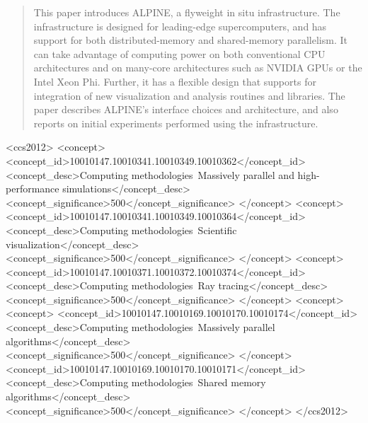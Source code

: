 \documentclass[sigconf]{acmart}
\begin{document}
\begin{abstract}
This paper introduces ALPINE, a flyweight in situ infrastructure.
%
The infrastructure is designed for leading-edge supercomputers, and
has support for both distributed-memory and shared-memory parallelism.
%
It can take advantage of computing power on both conventional CPU architectures
and on many-core architectures such as NVIDIA GPUs or the Intel Xeon Phi.
%
Further, it has a flexible design that supports for integration of new
visualization and analysis routines and libraries.
%
The paper describes ALPINE's interface choices and architecture, and also reports
on initial experiments performed using the infrastructure.
\end{abstract}
%
%
\begin{CCSXML}
<ccs2012>
<concept>
<concept_id>10010147.10010341.10010349.10010362</concept_id>
<concept_desc>Computing methodologies~Massively parallel and high-performance simulations</concept_desc>
<concept_significance>500</concept_significance>
</concept>
<concept>
<concept_id>10010147.10010341.10010349.10010364</concept_id>
<concept_desc>Computing methodologies~Scientific visualization</concept_desc>
<concept_significance>500</concept_significance>
</concept>
<concept>
<concept_id>10010147.10010371.10010372.10010374</concept_id>
<concept_desc>Computing methodologies~Ray tracing</concept_desc>
<concept_significance>500</concept_significance>
</concept>
<concept>
<concept>
<concept_id>10010147.10010169.10010170.10010174</concept_id>
<concept_desc>Computing methodologies~Massively parallel algorithms</concept_desc>
<concept_significance>500</concept_significance>
</concept>
<concept_id>10010147.10010169.10010170.10010171</concept_id>
<concept_desc>Computing methodologies~Shared memory algorithms</concept_desc>
<concept_significance>500</concept_significance>
</concept>
</ccs2012>
\end{CCSXML}





\newcommand{\fix}[1]{\textcolor{red}{#1}}
\end{document}
